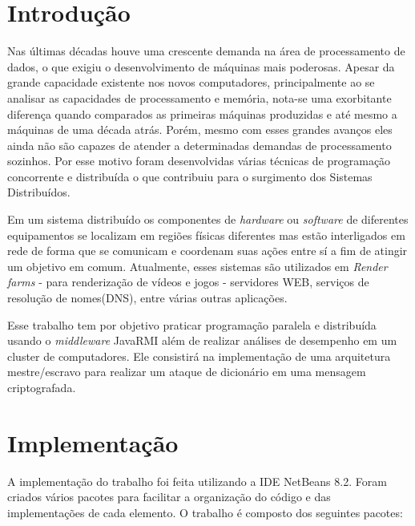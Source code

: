\documentclass[
	12pt,				%
    oneside,			%
	a4paper,			%
	english,			%
	brazil,				%
	]{abntex2}
\begin{document}
\chapter{Introdução} 
Nas últimas décadas houve uma crescente demanda na área de processamento de dados, o que exigiu o desenvolvimento de máquinas
mais poderosas. Apesar da grande capacidade existente nos novos computadores, principalmente ao se analisar as capacidades de processamento e memória, nota-se uma exorbitante diferença quando comparados as primeiras máquinas produzidas e até mesmo a máquinas de uma década atrás. Porém, mesmo com esses grandes avanços eles ainda não são capazes de atender a determinadas demandas de processamento sozinhos. Por esse motivo foram desenvolvidas várias técnicas de programação concorrente e distribuída o que contribuiu para o surgimento dos Sistemas Distribuídos.

Em um sistema distribuído os componentes de \textit{hardware} ou \textit{software} de diferentes equipamentos se localizam em regiões físicas diferentes mas estão interligados em rede de forma que se comunicam e coordenam suas ações entre sí a fim de
atingir um objetivo em comum. Atualmente, esses sistemas são utilizados em \textit{Render farms} - para renderização de vídeos
e jogos - servidores WEB, serviços de resolução de nomes(DNS), entre várias outras aplicações.

Esse trabalho tem por objetivo praticar programação paralela e distribuída usando o \textit{middleware} JavaRMI além de 
realizar análises de desempenho em um cluster de computadores. Ele consistirá na implementação de uma arquitetura mestre/escravo para realizar um ataque de dicionário em uma mensagem criptografada.


\chapter{Implementação} 
A implementação do trabalho foi feita utilizando a IDE NetBeans 8.2. Foram criados vários pacotes para facilitar a organização 
do código e das implementações de cada elemento. O trabalho é composto dos seguintes pacotes:
\end{document}
